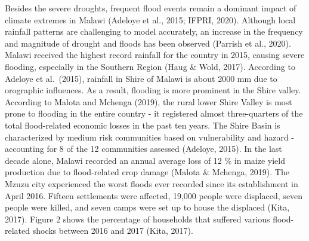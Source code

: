\documentclass[
]{book}
\begin{document}
Besides the severe droughts, frequent flood events remain a dominant impact of climate extremes in Malawi (Adeloye et al., 2015; IFPRI, 2020). Although local rainfall patterns are challenging to model accurately, an increase in the frequency and magnitude of drought and floods has been observed (Parrish et al., 2020). Malawi received the highest record rainfall for the country in 2015, causing severe flooding, especially in the Southern Region (Haug \& Wold, 2017). According to Adeloye et al.~(2015), rainfall in Shire of Malawi is about 2000 mm due to orographic influences. As a result, flooding is more prominent in the Shire valley. According to Malota and Mchenga (2019), the rural lower Shire Valley is most prone to flooding in the entire country - it registered almost three-quarters of the total flood-related economic losses in the past ten years. The Shire Basin is characterized by medium risk communities based on vulnerability and hazard - accounting for 8 of the 12 communities assessed (Adeloye, 2015). In the last decade alone, Malawi recorded an annual average loss of 12 \% in maize yield production due to flood-related crop damage (Malota \& Mchenga, 2019). The Mzuzu city experienced the worst floods ever recorded since its establishment in April 2016. Fifteen settlements were affected, 19,000 people were displaced, seven people were killed, and seven camps were set up to house the displaced (Kita, 2017). Figure 2 shows the percentage of households that suffered various flood-related shocks between 2016 and 2017 (Kita, 2017).
\end{document}
